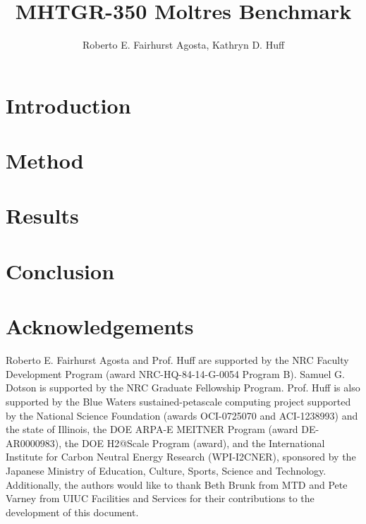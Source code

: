 \documentclass{anstrans}
\title{MHTGR-350 Moltres Benchmark}
\author{Roberto E. Fairhurst Agosta, Kathryn D. Huff}
\institute{
University of Illinois at Urbana-Champaign, Dept. of Nuclear, Plasma, and Radiological Engineering\\
ref3@illinois.edu
}
\begin{document}
\section{Introduction}

\section{Method}

\section{Results}

\section{Conclusion}

\section{Acknowledgements}

Roberto E. Fairhurst Agosta and Prof. Huff are supported by the \gls{NRC} Faculty Development Program (award NRC-HQ-84-14-G-0054 Program B). Samuel G. Dotson is supported by the \gls{NRC} Graduate Fellowship Program. Prof. Huff is also supported by the Blue Waters sustained-petascale computing project supported by the National Science Foundation (awards OCI-0725070 and ACI-1238993) and the state of Illinois, the DOE ARPA-E MEITNER Program (award DE-AR0000983), the DOE H2@Scale Program (award), and the International Institute for Carbon Neutral Energy Research (WPI-I2CNER), sponsored by the Japanese Ministry of Education, Culture, Sports, Science and Technology.
Additionally, the authors would like to thank Beth Brunk from \gls{MTD} and Pete Varney from \gls{UIUC} Facilities and Services for their contributions to the development of this document.



\end{document}
